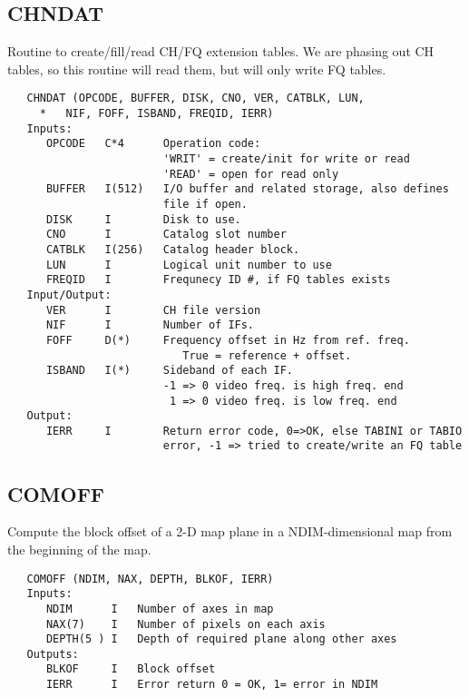 \subsection{CHNDAT}
Routine to create/fill/read CH/FQ extension tables.
We are phasing out CH tables, so this routine will read them, but
will only write FQ tables.
\begin{verbatim}
   CHNDAT (OPCODE, BUFFER, DISK, CNO, VER, CATBLK, LUN,
     *   NIF, FOFF, ISBAND, FREQID, IERR)
   Inputs:
      OPCODE   C*4      Operation code:
                        'WRIT' = create/init for write or read
                        'READ' = open for read only
      BUFFER   I(512)   I/O buffer and related storage, also defines
                        file if open.
      DISK     I        Disk to use.
      CNO      I        Catalog slot number
      CATBLK   I(256)   Catalog header block.
      LUN      I        Logical unit number to use
      FREQID   I        Frequnecy ID #, if FQ tables exists
   Input/Output:
      VER      I        CH file version
      NIF      I        Number of IFs.
      FOFF     D(*)     Frequency offset in Hz from ref. freq.
                           True = reference + offset.
      ISBAND   I(*)     Sideband of each IF.
                        -1 => 0 video freq. is high freq. end
                         1 => 0 video freq. is low freq. end
   Output:
      IERR     I        Return error code, 0=>OK, else TABINI or TABIO
                        error, -1 => tried to create/write an FQ table
\end{verbatim}

\subsection{COMOFF}
Compute the block offset of a 2-D map plane in a NDIM-dimensional
map from the beginning of the map.
\begin{verbatim}
   COMOFF (NDIM, NAX, DEPTH, BLKOF, IERR)
   Inputs:
      NDIM      I   Number of axes in map
      NAX(7)    I   Number of pixels on each axis
      DEPTH(5 ) I   Depth of required plane along other axes
   Outputs:
      BLKOF     I   Block offset
      IERR      I   Error return 0 = OK, 1= error in NDIM
\end{verbatim}

